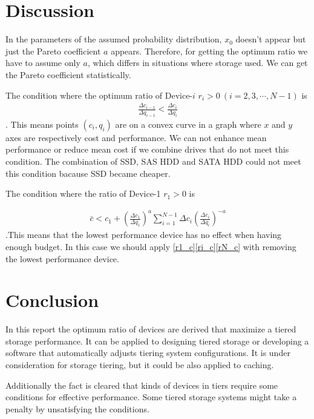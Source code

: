 \documentclass[a4paper,11pt]{article}
\begin{document}
\section{Discussion}

In the parameters of the assumed probability distribution, $x_0$ doesn't appear but just the Pareto coefficient $a$ appears.
Therefore, for getting the optimum ratio we have to assume only $a$, which differs in situations where storage used. We can get the Pareto coefficient statistically.

The condition where the optimum ratio of Device-$i$ $r_i > 0\ (i = 2, 3, \cdots, N-1)$  is
\begin{eqnarray}
\frac{\Delta c_{i-1}}{\Delta q_{i-1}} < \frac{\Delta c_i}{\Delta q_i}
\label{satuation}
\end{eqnarray}
. This means points $(c_i, q_i)$ are on a convex curve in a graph where $x$ and $y$ axes are respectively cost and performance.
We can not enhance mean performance or reduce mean cost if we combine drives that do not meet this condition. 
The combination of SSD, SAS HDD and SATA HDD could not meet this condition bacause SSD became cheaper.

The condition where the ratio of Device-1 $r_1 > 0$ is

\begin{eqnarray}
\bar{c} < c_1 + \left(\frac{\Delta c_1}{\Delta q_1}\right)^a \sum_{i=1}^{N-1}\Delta c_i
 \left(\frac{\Delta c_i}{\Delta q_i}\right)^{-a} \label{over_budget}
\end{eqnarray}
.This means that the lowest performance device has no effect when having enough budget.
In this case we should apply \eqref{r1_c}\eqref{ri_c}\eqref{rN_c} with removing the lowest performance device.

\section{Conclusion}

In this report the optimum ratio of devices are derived that maximize a tiered storage performance.
It can be applied to designing tiered storage or developing a software that automatically adjusts tiering system configurations.
It is under consideration for storage tiering, but it could be also applied to caching.

Additionally the fact is cleared that kinds of devices in tiers require some conditions for effective performance.
Some tiered storage systems might take a penalty by unsatisfying the conditions.
\end{document}
